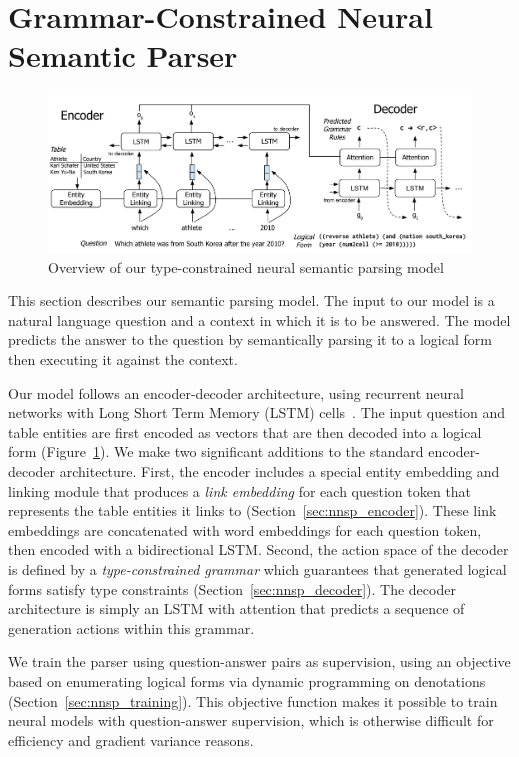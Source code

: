 \section{Grammar-Constrained Neural Semantic
Parser}\label{sec:grammar_constrained_model}
\begin{figure}
\centering
\includegraphics[width=6in]{figures/type_constrained_nnsp.png}
\caption{Overview of our type-constrained neural semantic parsing model}\label{fig:nnsp_model}
\end{figure}

This section describes our semantic parsing model.
The input to our model is a natural language question and a context in which it 
is to be answered.
The model predicts the answer to the question by semantically parsing it to a 
logical form then executing it against the context.

Our model follows an encoder-decoder architecture, using recurrent neural 
networks with Long Short Term Memory (LSTM) cells~\citep{hochreiter1997long}. 
The input question and table entities are first encoded as vectors that are 
then decoded into a logical form (Figure~\ref{fig:nnsp_model}).
We make two significant additions to the standard encoder-decoder architecture.
First, the encoder includes a special entity embedding and linking module that 
produces a \emph{link embedding} for each question token that represents the 
table entities it links to (Section~\ref{sec:nnsp_encoder}).
These link embeddings are concatenated with word embeddings for each question 
token, then encoded with a bidirectional LSTM\@.
Second, the action space of the decoder is defined by a \emph{type-constrained 
grammar} which guarantees that generated logical forms satisfy type constraints 
(Section~\ref{sec:nnsp_decoder}).
The decoder architecture is simply an LSTM with attention that predicts a 
sequence of generation actions within this grammar.

We train the parser using question-answer pairs as supervision, using an 
objective based on enumerating logical forms via dynamic programming on 
denotations \citep{pasupat2016inferring} (Section~\ref{sec:nnsp_training}). This 
objective function makes it possible to train neural models with 
question-answer supervision, which is otherwise difficult for efficiency and 
gradient variance reasons.

